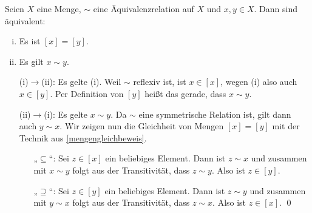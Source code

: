 \begin{satz} \label{aequiklassegleich}
    Seien $X$ eine Menge, $\sim$ eine Äquivalenzrelation auf $X$ und $x,y\in X$. Dann sind äquivalent:
    \begin{enumerate}[(i)]
        \item Es ist $[x]=[y]$.
        \item Es gilt $x\sim y$.
    \end{enumerate}
\end{satz}


\begin{bew} \quad
    \begin{itemize}
        \item[(i)$\to$(ii):] Es gelte (i). Weil $\sim$ reflexiv ist, ist $x\in [x]$, wegen (i) also auch $x\in [y]$. Per Definition von $[y]$ heißt das gerade, dass $x\sim y$.
        \item[(ii)$\to$(i):] Es gelte $x\sim y$. Da $\sim$ eine symmetrische Relation ist, gilt dann auch $y\sim x$. Wir zeigen nun die Gleichheit von Mengen $[x]=[y]$ mit der Technik aus \cref{mengengleichbeweis}.
        \begin{itemize}
            \item[„$\subseteq$“:] Sei $z\in [x]$ ein beliebiges Element. Dann ist $z\sim x$ und zusammen mit $x\sim y$ folgt aus der Transitivität, dass $z\sim y$. Also ist $z\in [y]$.
            \item[„$\supseteq$“:] Sei $z\in [y]$ ein beliebiges Element. Dann ist $z\sim y$ und zusammen mit $y\sim x$ folgt aus der Transitivität, dass $z\sim x$. Also ist $z\in [x]$. \qed
        \end{itemize}
    \end{itemize}
\end{bew}


